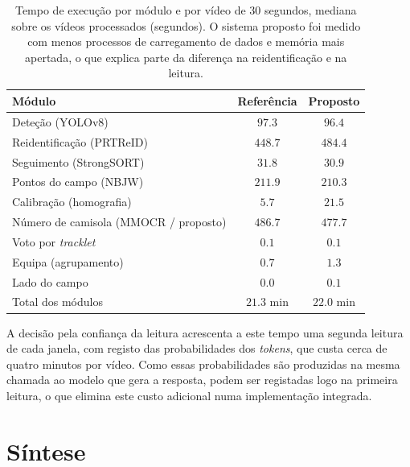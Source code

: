 \begin{table}[htbp]
    \centering
    \caption{Tempo de execução por módulo e por vídeo de $30$ segundos, mediana sobre os vídeos processados (segundos). O sistema proposto foi medido com menos processos de carregamento de dados e memória mais apertada, o que explica parte da diferença na reidentificação e na leitura.}
    \label{tab:tempos}
    \begin{tabular}{|l|c|c|}
        \hline
        \textbf{Módulo} & \textbf{Referência} & \textbf{Proposto} \\
        \hline
        Deteção (YOLOv8)                          & $97.3$  & $96.4$ \\
        \hline
        Reidentificação (PRTReID)                 & $448.7$ & $484.4$ \\
        \hline
        Seguimento (StrongSORT)                   & $31.8$  & $30.9$ \\
        \hline
        Pontos do campo (NBJW)                    & $211.9$ & $210.3$ \\
        \hline
        Calibração (homografia)                   & $5.7$   & $21.5$ \\
        \hline
        Número de camisola (MMOCR / proposto)     & $486.7$ & $477.7$ \\
        \hline
        Voto por \emph{tracklet}                  & $0.1$   & $0.1$ \\
        \hline
        Equipa (agrupamento)                      & $0.7$   & $1.3$ \\
        \hline
        Lado do campo                             & $0.0$   & $0.1$ \\
        \hline
        Total dos módulos                         & $21.3$ min & $22.0$ min \\
        \hline
    \end{tabular}
\end{table}

A decisão pela confiança da leitura acrescenta a este tempo uma segunda leitura de cada janela, com registo das probabilidades dos \emph{tokens}, que custa cerca de quatro minutos por vídeo. Como essas probabilidades são produzidas na mesma chamada ao modelo que gera a resposta, podem ser registadas logo na primeira leitura, o que elimina este custo adicional numa implementação integrada.

\section{Síntese}\label{sec:res_sintese}

